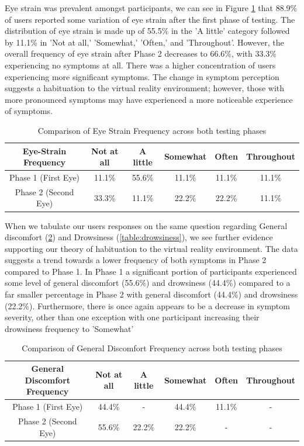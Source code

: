 \documentclass{l4proj}
\begin{document}
Eye strain was prevalent amongst participants, we can see in Figure \ref{table:eye_strain} that 88.9\% of users reported some variation of eye strain after the first phase of testing. The distribution of eye strain is made up of 55.5\% in the 'A little' category followed by 11.1\% in 'Not at all,' 'Somewhat,' 'Often,' and 'Throughout'. However, the overall frequency of eye strain after Phase 2 decreases to 66.6\%, with 33.3\% experiencing no symptoms at all. There was a higher concentration of users experiencing more significant symptoms. The change in symptom perception suggests a habituation to the virtual reality environment; however, those with more pronounced symptoms may have experienced a more noticeable experience of symptoms.
\begin{table}[h] 
    \centering
    \caption{Comparison of Eye Strain Frequency across both testing phases}
    \begin{tabular}{|c|c|c|c|c|c|}
        \hline
        \textbf{Eye-Strain Frequency} & Not at all & A little & Somewhat & Often & Throughout \\
        \hline
        Phase 1 (First Eye) & 11.1\%  & 55.6\% & 11.1\% & 11.1\% & 11.1\%\\
        \hline
        Phase 2 (Second Eye) & 33.3\% & 11.1\% & 22.2\% & 22.2\% & 11.1\%\\
        \hline
    \end{tabular}
    \label{table:eye_strain}
\end{table}

When we tabulate our users responses on the same question regarding General discomfort (\ref{table:general_discomfort}) and Drowsiness (\ref{table:drowsiness}), we see further evidence supporting our theory of habituation to the virtual reality environment. The data suggests a trend towards a lower frequency of both symptoms in Phase 2 compared to Phase 1. 
In Phase 1 a significant portion of participants experienced some level of general discomfort (55.6\%) and drowsiness (44.4\%) compared to a far smaller percentage in Phase 2 with general discomfort (44.4\%) and drowsiness (22.2\%). Furthermore, there is once again appears to be a decrease in symptom severity, other than one exception with one participant increasing their drowsiness frequency to 'Somewhat'
\begin{table}[h]
    \centering
    \caption{Comparison of General Discomfort Frequency across both testing phases}
    \label{table:general_discomfort}
    \begin{tabular}{|c|c|c|c|c|c|}
        \hline
        \textbf{General Discomfort Frequency} & Not at all & A little & Somewhat & Often & Throughout \\
        \hline
        Phase 1 (First Eye) & 44.4\%  & - & 44.4\% & 11.1\% & - \\
        \hline
        Phase 2 (Second Eye) & 55.6\% & 22.2\% & 22.2\% & - & - \\
        \hline
    \end{tabular}
\end{table}
\end{document}
